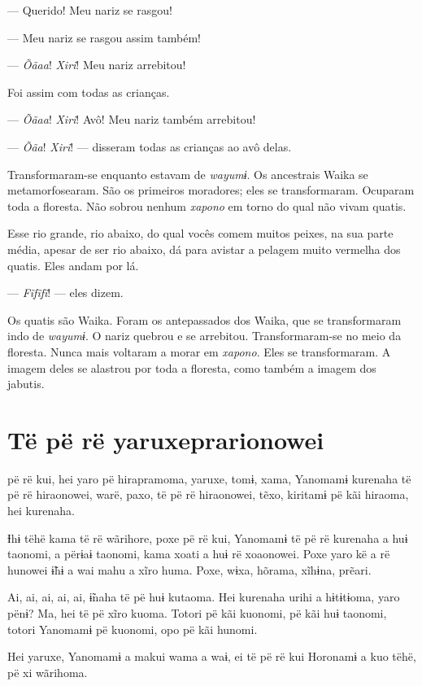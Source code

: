 --- Querido! Meu nariz se rasgou! 

--- Meu nariz se rasgou assim também!

--- \textit{Õãaa}! \textit{Xiri}! Meu nariz arrebitou! 

Foi assim com todas as crianças. 

--- \textit{Õãaa}! \textit{Xiri}! Avô! Meu nariz também arrebitou! 

--- \textit{Õãa}! \textit{Xiri}! --- disseram todas as crianças ao avô delas. 

Transformaram-se enquanto estavam de \textit{wayumɨ}. Os ancestrais Waika
se metamorfosearam. São os primeiros moradores; eles se transformaram.
Ocuparam toda a floresta. Não sobrou nenhum \textit{xapono} em torno do qual não
vivam quatis. 

Esse rio grande, rio abaixo, do qual vocês comem muitos peixes, na sua
parte média, apesar de ser rio abaixo, dá para avistar a pelagem muito
vermelha dos quatis. Eles andam por lá. 

--- \textit{Fĩfĩfĩ}! --- eles dizem. 

Os quatis são Waika. Foram os antepassados dos Waika, que se
transformaram indo de \textit{wayumɨ}. O nariz quebrou e se arrebitou.
Transformaram-se no meio da floresta. Nunca mais voltaram a morar em
\textit{xapono}. Eles se transformaram. A imagem deles se alastrou por toda a
floresta, como também a imagem dos jabutis.

\chapter{Të pë rë yaruxeprarionowei}

 pë rë kui, hei yaro pë hirapramoma, yaruxe, tomɨ, xama, Yanomamɨ
kurenaha të pë rë hiraonowei, warë, paxo, të pë rë hiraonowei, tẽxo,
kiritamɨ pë kãi hiraoma, hei kurenaha. 

Ɨhɨ tëhë kama të rë wãrihore, poxe pë rë kui, Yanomamɨ të pë rë kurenaha
a huɨ taonomi, a përɨaɨ taonomi, kama xoati a huɨ rë xoaonowei. Poxe
yaro kë a rë hunowei ɨ̃hɨ a wai mahu a xĩro huma. Poxe, wɨxa, hõrama,
xĩhɨna, prẽari. 

Ai, ai, ai, ai, ai, ɨ̃naha të pë huɨ kutaoma. Hei kurenaha urihi a
hɨtɨtɨoma, yaro pënɨ? Ma, hei të pë xĩro kuoma. Totori pë kãi kuonomi,
pë kãi huɨ taonomi, totori Yanomamɨ pë kuonomi, opo pë kãi hunomi. 

Hei yaruxe, Yanomamɨ a makui wama a waɨ, ei të pë rë kui Horonamɨ a kuo
tëhë, pë xi wãrihoma. 

